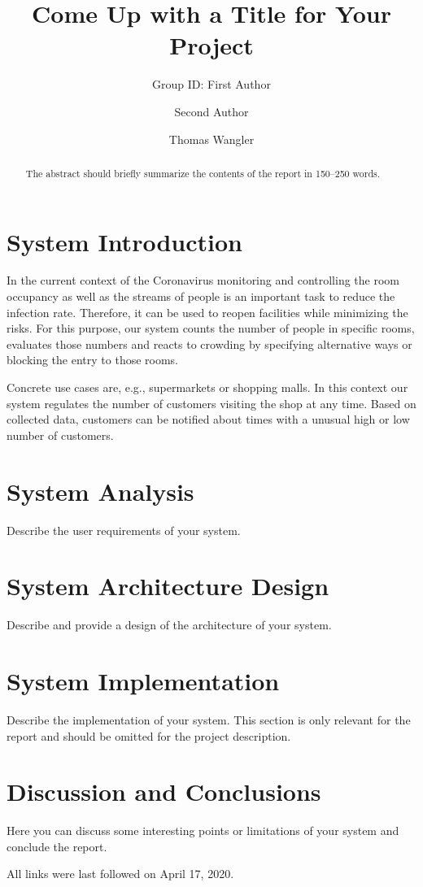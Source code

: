 \documentclass[runningheads]{llncs}
\begin{document}
%
\title{Come Up with a Title for Your Project}

\author{Group ID: First Author \and
Second Author \and
Thomas Wangler}

%
\maketitle              %
%
\begin{abstract}
The abstract should briefly summarize the contents of the report in
150--250 words. 

\end{abstract}
%
%
%
\section{System Introduction}
In the current context of the Coronavirus monitoring and controlling the room occupancy as well as the streams of people is an important task to reduce the infection rate. Therefore, it can be used to reopen facilities while minimizing the risks. For this purpose, our system counts the number of people in specific rooms, evaluates those numbers and reacts to crowding by specifying alternative ways or blocking the entry to those rooms.

Concrete use cases are, e.g., supermarkets or shopping malls. In this context our system regulates the number of customers visiting the shop at any time. Based on collected data, customers can be notified about times with a unusual high or low number of customers. 

\section{System Analysis}
Describe the user requirements of your system.

\section{System Architecture Design}
Describe and provide a design of the architecture of your system.

\section{System Implementation}
Describe the implementation of your system. This section is only relevant for the report and should be omitted for the project description. 

\section{Discussion and Conclusions}
Here you can discuss some interesting points or limitations of your system and conclude the report.

%
%



All links were last followed on April 17, 2020.
\end{document}
